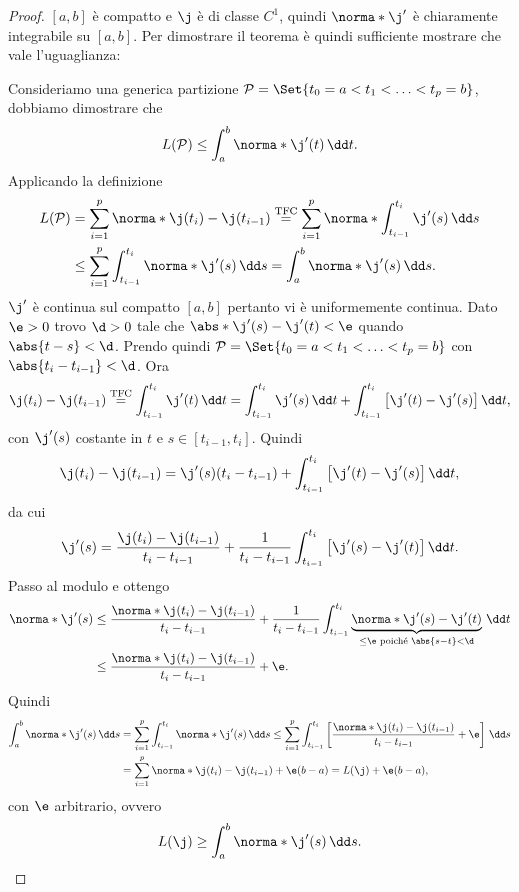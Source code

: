 \begin{proof}
	\([a,b]\) è compatto e \(\j\) è di classe \(C^1\), quindi \(\norma*{\j'}\) è chiaramente integrabile su \([a,b]\).
	Per dimostrare il teorema è quindi sufficiente mostrare che vale l'uguaglianza:

	\graffito{\(\le)\)}Consideriamo una generica partizione \(\mathcal{P}=\Set{t_0=a<t_1<\ldots<t_p=b}\), dobbiamo dimostrare che
	\[
		L(\mathcal{P}) \le \int_a^b \norma*{\j'(t)}\,\dd t.
	\]
	Applicando la definizione
	\[
		\begin{split}
			L(\mathcal{P}) & = \sum_{i=1}^p \norma*{\j(t_i) - \j(t_{i-1})} \overset{\text{TFC}}{=} \sum_{i=1}^p \norma*{\int_{t_{i-1}}^{t_i} \j'(s)\,\dd s}\\
			& \le \sum_{i=1}^p \int_{t_{i-1}}^{t_i} \norma*{\j'(s)}\,\dd s = \int_a^b \norma*{\j'(s)}\,\dd s.
		\end{split}
	\]
	\graffito{\(\ge)\)}\(\j'\) è continua sul compatto \([a,b]\) pertanto vi è uniformemente continua.
	Dato \(\e>0\) trovo \(\d>0\) tale che \(\abs*{\j'(s)-\j'(t)}<\e\) quando \(\abs{t-s}<\d\).
	Prendo quindi \(\mathcal{P}=\Set{t_0=a < t_1 < \ldots < t_p=b}\) con \(\abs{t_i-t_{i-1}}<\d\).
	Ora
	\[
		\j(t_i)-\j(t_{i-1}) \overset{\text{TFC}}{=} \int_{t_{i-1}}^{t_i} \j'(t)\,\dd t = \int_{t_{i-1}}^{t_i} \j'(s)\,\dd t + \int_{t_{i-1}}^{t_i}\big[\j'(t)-\j'(s)\big]\,\dd t,
	\]
	con \(\j'(s)\) costante in \(t\) e \(s\in [t_{i-1},t_i]\).
	Quindi
	\[
		\j(t_i)-\j(t_{i-1}) = \j'(s)(t_i-t_{i-1}) + \int_{t_{i-1}}^{t_i} \big[\j'(t)-\j'(s)\big]\,\dd t,
	\]
	da cui
	\[
		\j'(s) = \frac{\j(t_i)-\j(t_{i-1})}{t_i-t_{i-1}} + \frac{1}{t_i-t_{i-1}} \int_{t_{i-1}}^{t_i} \big[\j'(s)-\j'(t)\big]\,\dd t.
	\]
	Passo al modulo e ottengo
	\[
		\begin{split}
			\norma*{\j'(s)} & \le \frac{\norma*{\j(t_i)-\j(t_{i-1})}}{t_i-t_{i-1}} + \frac{1}{t_i-t_{i-1}} \int_{t_{i-1}}^{t_i} \underbrace{\norma*{\j'(s)-\j'(t)}}_{\le \e \text{ poiché }\abs{s-t}<\d}\,\dd t\\
			& \le \frac{\norma*{\j(t_i)-\j(t_{i-1})}}{t_i-t_{i-1}} + \e.
		\end{split}
	\]
	Quindi
	\[
		\begin{split}
			\int_a^b \norma*{\j'(s)}\,\dd s & = \sum_{i=1}^p \int_{t_{i-1}}^{t_i} \norma*{\j'(s)}\,\dd s \le \sum_{i=1}^p \int_{t_{i-1}}^{t_i} \left[\frac{\norma*{\j(t_i)-\j(t_{i-1})}}{t_i-t_{i-1}}+\e\right]\,\dd s\\
			& = \sum_{i=1}^p \norma*{\j(t_i) - \j(t_{i-1})} + \e(b-a) = L(\j) + \e(b-a),
		\end{split}
	\]
	con \(\e\) arbitrario, ovvero
	\[
		L(\j) \ge \int_a^b \norma*{\j'(s)}\,\dd s.\qedhere
	\]
\end{proof}
